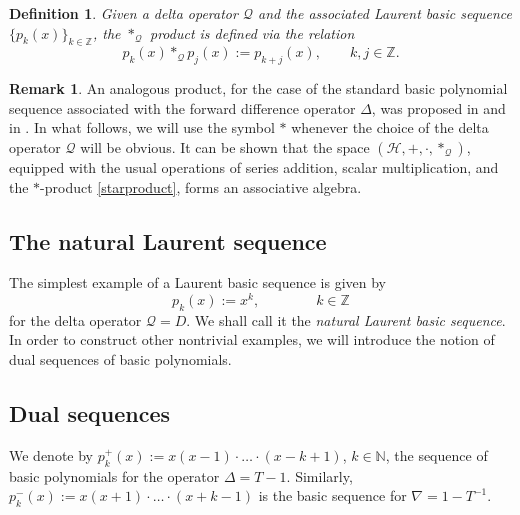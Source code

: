 \documentclass[10pt]{amsart}
\numberwithin{equation}{section}
\newtheorem{definition}{Definition}
\theoremstyle{definition}
\newtheorem{remark}{\textbf{Remark}}
\begin{document}
\begin{definition}
\label{defn3}
Given a delta operator $\mathcal{Q}$ and the associated Laurent basic sequence
$\{p_{k}(x)\}_{k\in \mathbb{Z}}$, the $*_{\mathcal{Q}}$ product is defined
via the relation
\begin{equation}
p_{k}(x)*_{\mathcal{Q}} p_{j}(x):=p_{k+j}(x), \qquad k,j \in
\mathbb{Z}.
\label{starproduct}
\end{equation}
\end{definition}
\begin{remark}
\label{rem1}
An analogous product, for the case of the standard basic polynomial sequence
associated with the forward difference operator $\Delta $, was proposed
in \cite{Ward} and in \cite{ismail}. In what follows, we will use the symbol
$*$ whenever the choice of the delta operator $\mathcal{Q}$ will be obvious.
It can be shown that the space
$(\mathcal{H}, +,\cdot , *_{\mathcal{Q}})$, equipped with the usual operations
of series addition, scalar multiplication, and the $*$-product  \eqref{starproduct}, forms an associative algebra.
\end{remark}

\subsection{The natural Laurent sequence}
\label{sec3.2}

The simplest example of a Laurent basic sequence is given by
\begin{equation}
\label{nL}
p_{k}(x):= x^{k}, \qquad \qquad k\in \mathbb{Z}
\end{equation}
for the delta operator $\mathcal{Q}= D$. We shall call it the
\textit{natural Laurent basic sequence}. In order to construct other nontrivial
examples, we will introduce the notion of dual sequences of basic polynomials.

\subsection{Dual sequences}
\label{sec3.3}

We denote by $p^{+}_{k}(x):=x(x-1)\cdot \ldots \cdot (x-k+1)$,
$k\in \mathbb{N}$, the sequence of basic polynomials for the operator
$\Delta =T-1$. Similarly,
$p^{-}_{k}(x):=x(x+1)\cdot \ldots \cdot (x+k-1)$ is the basic sequence
for $\nabla =1-T^{-1}$.
\end{document}
